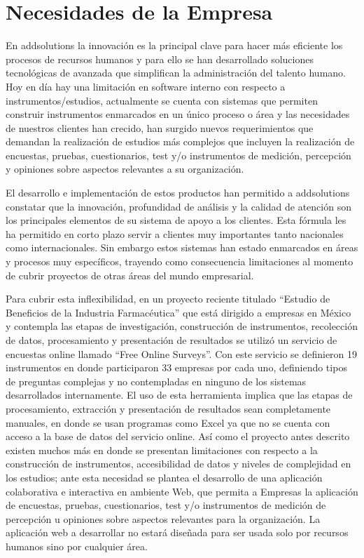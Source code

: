 \chapter{Necesidades de la Empresa}
En addsolutions la innovación es la principal clave para hacer más eficiente los procesos de recursos humanos y para ello se han desarrollado soluciones tecnológicas de avanzada que simplifican la administración del talento humano. Hoy en día hay una limitación en software interno con respecto a instrumentos/estudios, actualmente se cuenta con sistemas que permiten construir instrumentos enmarcados en un único proceso o área y las necesidades de nuestros clientes han crecido, han surgido nuevos requerimientos que demandan la realización de estudios más complejos que incluyen la realización de encuestas, pruebas, cuestionarios, test y/o instrumentos de medición, percepción y opiniones sobre aspectos relevantes a su organización.

El desarrollo e implementación de estos productos han permitido a addsolutions constatar que la innovación, profundidad de análisis y la calidad de atención son los principales elementos de su sistema de apoyo a los clientes. Esta fórmula les ha permitido en corto plazo servir a clientes muy importantes tanto nacionales como internacionales. Sin embargo estos sistemas han estado enmarcados en áreas y procesos muy específicos, trayendo como consecuencia limitaciones al momento de cubrir proyectos de otras áreas del mundo empresarial.

Para cubrir esta inflexibilidad, en un proyecto reciente titulado “Estudio de Beneficios de la Industria Farmacéutica” que está dirigido a empresas en México y contempla las etapas de investigación, construcción de instrumentos, recolección de datos, procesamiento y presentación de resultados se utilizó un servicio de encuestas online llamado “Free Online Surveys”. Con este servicio se definieron 19 instrumentos en donde participaron 33 empresas por cada uno, definiendo tipos de preguntas complejas y no contempladas en ninguno de los sistemas desarrollados internamente. El uso de esta herramienta implica que las etapas de procesamiento, extracción y presentación de resultados sean completamente manuales, en donde se usan programas como Excel ya que no se cuenta con acceso a la base de datos del servicio online. Así como el proyecto antes descrito existen muchos más en donde se presentan limitaciones con respecto a la construcción de instrumentos, accesibilidad de datos y niveles de complejidad en los estudios; ante esta necesidad  se plantea el desarrollo de una aplicación colaborativa e interactiva en ambiente Web, que permita a Empresas la aplicación de encuestas, pruebas, cuestionarios, test y/o instrumentos de medición de percepción u opiniones sobre aspectos relevantes para la organización. La aplicación web a desarrollar no estará diseñada para ser usada solo por recursos humanos sino por cualquier área.
